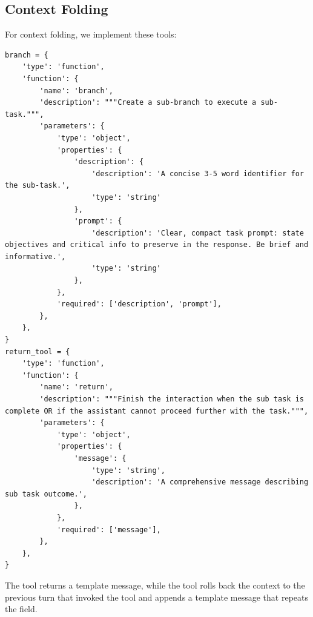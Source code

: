 \subsection{Context Folding}
For context folding, we implement these tools:
{\footnotesize
\begin{Verbatim}[breaklines, breakanywhere]
branch = {
    'type': 'function',
    'function': {
        'name': 'branch',
        'description': """Create a sub-branch to execute a sub-task.""",
        'parameters': {
            'type': 'object',
            'properties': {
                'description': {
                    'description': 'A concise 3-5 word identifier for the sub-task.',
                    'type': 'string'
                },
                'prompt': {
                    'description': 'Clear, compact task prompt: state objectives and critical info to preserve in the response. Be brief and informative.',
                    'type': 'string'
                },
            },
            'required': ['description', 'prompt'],
        },
    },
}
return_tool = {
    'type': 'function',
    'function': {
        'name': 'return',
        'description': """Finish the interaction when the sub task is complete OR if the assistant cannot proceed further with the task.""",
        'parameters': {
            'type': 'object',
            'properties': {
                'message': {
                    'type': 'string',
                    'description': 'A comprehensive message describing sub task outcome.',
                },
            },
            'required': ['message'],
        },
    },
}
\end{Verbatim}
}

The  tool returns a template message, while the  tool rolls back the context to the previous turn that invoked the  tool and appends a template message that repeats the  field.



